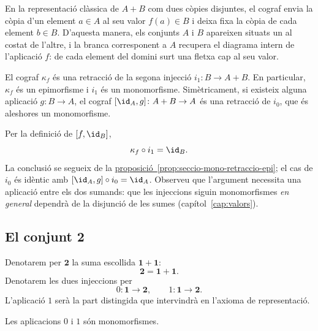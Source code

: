 \begin{observacio}\label{obs:cograf-classic}
En la representació clàssica de \(A+B\) com dues còpies disjuntes, el cograf envia la còpia d'un element \(a\in A\) al seu valor \(f(a)\in B\) i deixa fixa la còpia de cada element \(b\in B\). D'aquesta manera, els conjunts \(A\) i \(B\) apareixen situats un al costat de l'altre, i la branca corresponent a \(A\) recupera el diagrama intern de l'aplicació \(f\): de cada element del domini surt una fletxa cap al seu valor.
\end{observacio}

\begin{proposicio}\label{prop:cograf-retraccio}
El cograf \(\kappa_f\) és una retracció de la segona injecció \(i_1:B\to A+B\). En particular, \(\kappa_f\) és un epimorfisme i \(i_1\) és un monomorfisme. Simètricament, si existeix alguna aplicació \(g\colon B\to A\), el cograf \([\id_A,g]\colon A+B\to A\) és una retracció de \(i_0\), que és aleshores un monomorfisme.
\end{proposicio}

\begin{prova}
Per la definició de \([f,\id_B]\),
\[
\kappa_f\circ i_1=\id_B.
\]
La conclusió se segueix de la \hyperref[prop:seccio-mono-retraccio-epi]{proposició~\ref*{prop:seccio-mono-retraccio-epi}}; el cas de \(i_0\) és idèntic amb \([\id_A,g]\circ i_0=\id_A\). Observeu que l'argument necessita una aplicació entre els dos sumands: que les injeccions siguin monomorfismes \emph{en general} dependrà de la disjunció de les sumes (capítol~\ref{cap:valors}).
\end{prova}

\subsection{El conjunt \texorpdfstring{\(\mathbf2\)}{2}}\label{dos-oficial}

\begin{notacio}\label{not:dos}
Denotarem per \(\mathbf2\) la suma escollida \(\mathbf1+\mathbf1\):
\[
\mathbf2=\mathbf1+\mathbf1.
\]
Denotarem les dues injeccions per
\[
0:\mathbf1\to\mathbf2,
\qquad
1:\mathbf1\to\mathbf2.
\]
L'aplicació \(1\) serà la part distingida que intervindrà en l'axioma de representació.
\end{notacio}

\begin{corollari}\label{prop:zero-u-mono}
Les aplicacions \(0\) i \(1\) són monomorfismes.
\end{corollari}


